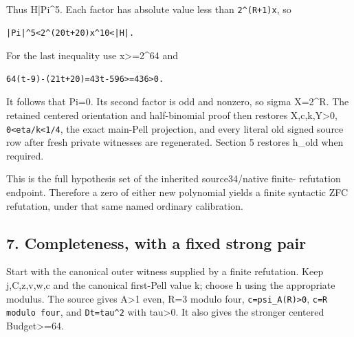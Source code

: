 Thus H|Pi\textasciicircum{}\allowbreak{}5. Each factor has absolute value less than \texttt{2\textasciicircum{}\allowbreak{}(R+\allowbreak{}1)x}, so



\begin{verbatim}
|Pi|^5<2^(20t+20)x^10<|H|.
\end{verbatim}

For the last inequality use x\textgreater{}\allowbreak{}=\allowbreak{}2\textasciicircum{}\allowbreak{}64 and



\begin{verbatim}
64(t-9)-(21t+20)=43t-596>=436>0.
\end{verbatim}

It follows that Pi=\allowbreak{}0. Its second factor is odd and nonzero, so sigma X=\allowbreak{}2\textasciicircum{}\allowbreak{}R. The retained centered orientation and half-binomial proof then restores X,c,k,Y\textgreater{}\allowbreak{}0, \texttt{0\textless{}\allowbreak{}eta/\allowbreak{}k\textless{}\allowbreak{}1/\allowbreak{}4}, the exact main-Pell projection, and every literal old signed source row after fresh private witnesses are regenerated. Section 5 restores h\_\allowbreak{}old when required.



This is the full hypothesis set of the inherited source34/\allowbreak{}native finite- refutation endpoint. Therefore a zero of either new polynomial yields a finite syntactic ZFC refutation, under that same named ordinary calibration.



\subsection{7. Completeness, with a fixed strong pair}



Start with the canonical outer witness supplied by a finite refutation. Keep j,C,z,v,w,c and the canonical first-Pell value k; choose h using the appropriate modulus. The source gives A\textgreater{}\allowbreak{}1 even, R=\allowbreak{}3 modulo four, \texttt{c=\allowbreak{}psi\_\allowbreak{}A(R)\textgreater{}\allowbreak{}0}, \texttt{c=\allowbreak{}R modulo four}, and \texttt{Dt=\allowbreak{}tau\textasciicircum{}\allowbreak{}2} with tau\textgreater{}\allowbreak{}0. It also gives the stronger centered Budget\textgreater{}\allowbreak{}=\allowbreak{}64.



